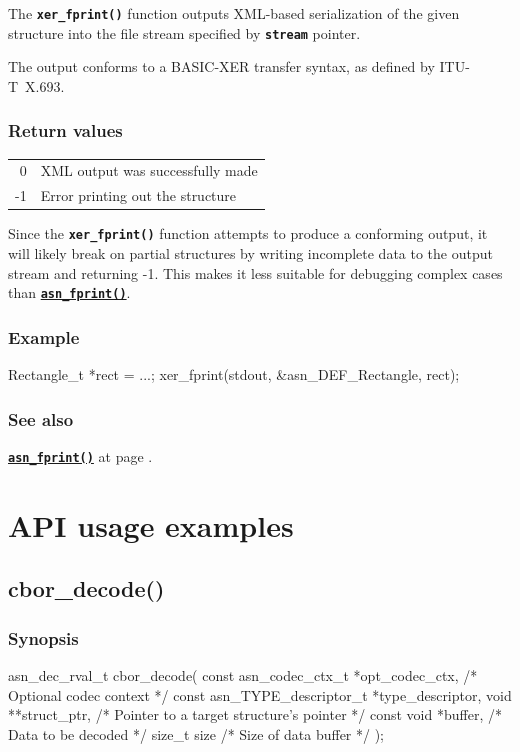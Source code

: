 \documentclass[english,oneside,12pt]{book}
\newcommand{\apisection}[2]{\clearpage\section{\label{#1}#2}}
\newcommand{\api}[2]{\hyperref[#1]{\code{#2}}}
\newcommand{\seealso}[2]{\api{#1}{#2} at page \pageref{#1}}
\newcommand{\code}[1]{\texttt{\textbf{\lstinline{#1}}}}
\begin{document}
The \code{xer_fprint()} function outputs XML-based serialization
of the given structure into the file stream specified by
\code{stream} pointer.

The output conforms to a BASIC-XER transfer syntax, as defined by ITU-T~X.693.

\subsection*{Return values}

\begin{tabular}[h!]{rl}
0 & XML output was successfully made \\
-1 & Error printing out the structure
\end{tabular}

\noindent{}Since the \code{xer_fprint()} function attempts to produce a conforming output,
it will likely break on partial structures by writing incomplete data
to the output stream and returning -1. This makes it less suitable for
debugging complex cases than \api{sec:asn_fprint}{asn_fprint()}.

\subsection*{Example}
\begin{example}
Rectangle_t *rect = ...;
xer_fprint(stdout, &asn_DEF_Rectangle, rect);
\end{example}

\subsection*{See also}
\seealso{sec:asn_fprint}{asn_fprint()}.

\chapter{API usage examples}

\apisection{sec:cbor_decode}{cbor\_decode()}

\subsection*{Synopsis}
\begin{signature}
asn_dec_rval_t cbor_decode(
    const asn_codec_ctx_t *opt_codec_ctx,   /* Optional codec context */
    const asn_TYPE_descriptor_t *type_descriptor,
    void **struct_ptr,  /* Pointer to a target structure's pointer */
    const void *buffer, /* Data to be decoded */
    size_t size         /* Size of data buffer */
);
\end{signature}
\end{document}
